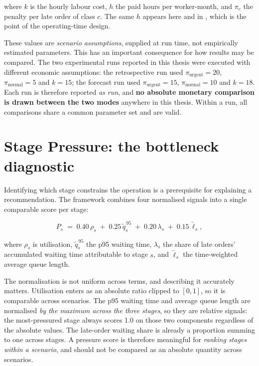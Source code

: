 \noindent where \(k\) is the hourly labour cost, \(h\) the paid hours per worker-month, and
\(\pi_c\) the penalty per late order of class \(c\). The same \(h\) appears here and in
, which is the point of the operating-time design.

These values are \emph{scenario assumptions}, supplied at run time, not empirically estimated
parameters. This has an important consequence for how results may be compared. The two
experimental runs reported in this thesis were executed with different economic assumptions:
the retrospective run used \(\pi_{\text{urgent}} = 20\), \(\pi_{\text{normal}} = 5\) and
\(k = 15\); the forecast run used \(\pi_{\text{urgent}} = 15\),
\(\pi_{\text{normal}} = 10\) and \(k = 18\). Each run is therefore reported \emph{as run}, and
\textbf{no absolute monetary comparison is drawn between the two modes} anywhere in this
thesis. Within a run, all comparisons share a common parameter set and are valid.

\section{Stage Pressure: the bottleneck diagnostic}
\label{sec:stage-pressure}

Identifying which stage constrains the operation is a prerequisite for explaining a
recommendation. The framework combines four normalised signals into a single comparable score
per stage:

\begin{equation}
P_s \;=\; 0.40\,\rho_s \;+\; 0.25\,\widetilde{q}^{\,95}_s \;+\; 0.20\,\lambda_s
      \;+\; 0.15\,\widetilde{\ell}_s,
\label{eq:pressure}
\end{equation}

\noindent where \(\rho_s\) is utilisation, \(\widetilde{q}^{\,95}_s\) the p95 waiting time,
\(\lambda_s\) the share of late orders' accumulated waiting time attributable to stage \(s\),
and \(\widetilde{\ell}_s\) the time-weighted average queue length.

The normalisation is not uniform across terms, and describing it accurately matters.
Utilisation enters as an absolute ratio clipped to \([0,1]\), so it is comparable across
scenarios. The p95 waiting time and average queue length are normalised \emph{by the maximum
across the three stages}, so they are relative signals: the most-pressured stage always scores
\num{1.0} on those two components regardless of the absolute values. The late-order waiting
share is already a proportion summing to one across stages. A pressure score is therefore
meaningful for \emph{ranking stages within a scenario}, and should not be compared as an
absolute quantity across scenarios.

